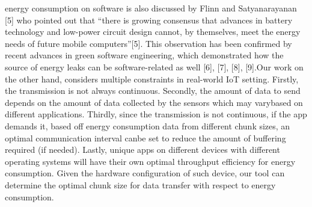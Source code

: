 energy consumption on software is also discussed by Flinn and Satyanarayanan [5] who pointed out that “there is growing consensus that advances in battery technology and low-power circuit design cannot, by themselves, meet the energy needs of future mobile computers”[5]. This observation has been confirmed by recent advances in green software engineering, which demonstrated how the source of energy leaks can be software-related as well [6], [7], [8], [9].Our work on the other hand, considers multiple constraints in real-world IoT setting. Firstly, the transmission is not always continuous. Secondly, the amount of data to send depends on the amount of data collected by the sensors which may varybased on different applications. Thirdly, since the transmission is not continuous, if the app demands it, based off energy consumption data from different chunk sizes, an  optimal  communication  interval  canbe  set  to  reduce  the  amount  of  buffering required  (if  needed).  Lastly,  unique  apps  on  different  devices  with  different operating  systems  will  have  their  own  optimal  throughput  efficiency  for  energy consumption.  Given  the  hardware  configuration  of  such  device,  our  tool  can determine   the   optimal   chunk   size   for   data   transfer   with   respect   to   energy consumption.